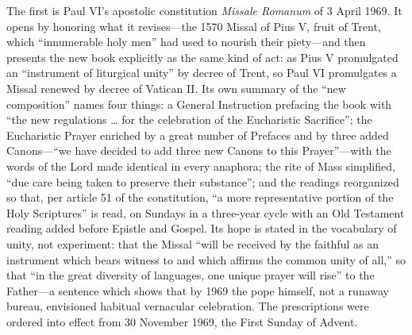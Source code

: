 The first is Paul VI's apostolic constitution \emph{Missale Romanum} of 3 April 1969. It opens by honoring what it revises---the 1570 Missal of Pius V, fruit of Trent, which ``innumerable holy men'' had used to nourish their piety---and then presents the new book explicitly as the same kind of act: as Pius V promulgated an ``instrument of liturgical unity'' by decree of Trent, so Paul VI promulgates a Missal renewed by decree of Vatican II. Its own summary of the ``new composition'' names four things: a General Instruction prefacing the book with ``the new regulations \ldots{} for the celebration of the Eucharistic Sacrifice''; the Eucharistic Prayer enriched by a great number of Prefaces and by three added Canons---``we have decided to add three new Canons to this Prayer''---with the words of the Lord made identical in every anaphora; the rite of Mass simplified, ``due care being taken to preserve their substance''; and the readings reorganized so that, per article 51 of the constitution, ``a more representative portion of the Holy Scriptures'' is read, on Sundays in a three-year cycle with an Old Testament reading added before Epistle and Gospel. Its hope is stated in the vocabulary of unity, not experiment: that the Missal ``will be received by the faithful as an instrument which bears witness to and which affirms the common unity of all,'' so that ``in the great diversity of languages, one unique prayer will rise'' to the Father---a sentence which shows that by 1969 the pope himself, not a runaway bureau, envisioned habitual vernacular celebration. The prescriptions were ordered into effect from 30 November 1969, the First Sunday of Advent.

